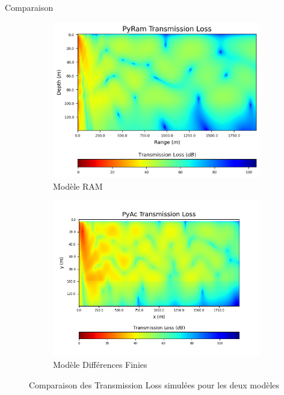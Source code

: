 \documentclass[9pt, xcolor={usenames, dvipsnames}]{beamer}
\begin{document}
			\begin{frame}{Comparaison}
				\begin{figure}[!htb]
					\centering
					\begin{subfigure}[b]{0.46\textwidth}
						\centering
						\includegraphics[width=\textwidth]{images/PyRam_Proteus.png}
						\caption{Modèle RAM}
						\label{fig:RAM}
					\end{subfigure}
					\hfill
					\begin{subfigure}[b]{0.49\textwidth}
						\centering
						\includegraphics[width=\textwidth]{images/PyAc_Proteus_corrected.png}
						\caption{Modèle Différences Finies}
						\label{fig:FD}
					\end{subfigure}
					\caption{Comparaison des Transmission Loss simulées pour les deux modèles}
					\label{fig:comparison}
				\end{figure}
			\end{frame}
\end{document}
